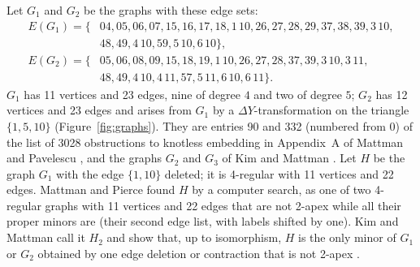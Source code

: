 \documentclass[11pt]{article}
\theoremstyle{remark}
\begin{document}
Let $G_1$ and $G_2$ be the graphs with these edge sets:
\begin{align*}
E(G_1)=\{&04,05,06,07,15,16,17,18,1\,10,26,27,28,29,37,38,39,3\,10,\\
&48,49,4\,10,59,5\,10,6\,10\},\\
E(G_2)=\{&05,06,08,09,15,18,19,1\,10,26,27,28,37,39,3\,10,3\,11,\\
&48,49,4\,10,4\,11,57,5\,11,6\,10,6\,11\}.
\end{align*}
$G_1$ has 11 vertices and 23 edges, nine of degree $4$ and two of degree $5$;
$G_2$ has 12 vertices and 23 edges and arises from $G_1$ by a
$\Delta Y$-transformation on the triangle $\{1,5,10\}$
(Figure~\ref{fig:graphs}). They are entries 90 and 332 (numbered from 0)
of the list of 3028 obstructions to knotless embedding in Appendix~A of
Mattman and Pavelescu \cite{MP}, and the graphs $G_2$ and $G_3$ of Kim
and Mattman \cite[\S3]{KM}. Let $H$ be the graph $G_1$ with the edge
$\{1,10\}$ deleted; it is 4-regular with 11 vertices and 22 edges.
Mattman and Pierce found $H$ by a computer search, as one of two 4-regular
graphs with 11 vertices and 22 edges that are not 2-apex while all their
proper minors are \cite[\S2]{MPi} (their second edge list, with labels
shifted by one). Kim and Mattman call it $H_2$ and show that, up to isomorphism, $H$ is the
only minor of $G_1$ or $G_2$ obtained by one edge deletion or contraction
that is not 2-apex \cite[\S\S3.1, 3.3]{KM}.
\end{document}
